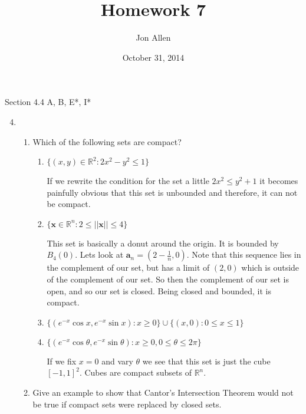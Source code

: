 \documentclass[letterpaper]{article}
\begin{document}
\title{Homework 7}
\date{October 31, 2014}
\author{Jon Allen}
\maketitle
Section 4.4  A, B, E*, I*
\renewcommand{\labelenumi}{4.\arabic{enumi}}
\renewcommand{\labelenumii}{\Alph{enumii}.}
\renewcommand{\labelenumiii}{(\alph{enumiii})}
\begin{enumerate}
\setcounter{enumi}{3}
\item
  \begin{enumerate}
  \item
    Which of the following sets are compact?
    \begin{enumerate}
    \item
      $\{(x,y)\in\mathbb{R}^2:2x^{2}-y^{2}\le 1\}$

      If we rewrite the condition for the set a little $2x^2\le y^2+1$ it becomes painfully obvious that this set is unbounded and therefore, it can not be compact.
    \item
      $\{\boldsymbol{x}\in\mathbb{R}^n:2\le||\boldsymbol{x}||\le4\}$

      This set is basically  a donut around the origin. It is bounded by $B_4(0)$. Lets look at $\boldsymbol{a}_n=(2-\frac{1}{n},0)$. Note that this sequence lies in the complement of our set, but has a limit of $(2,0)$ which is outside of the complement of our set. So  then the complement of our set is open, and so our set is closed. Being closed and bounded, it is compact.
    \item
      $\{(e^{-x}\cos x,e^{-x}\sin x):x\ge 0\}\cup\{(x,0):0\le x\le 1\}$
    \item
      $\{(e^{-x}\cos \theta,e^{-x}\sin \theta):x\ge0,0\le\theta\le2\pi\}$

      If we fix $x=0$ and vary $\theta$ we see that this set is just the cube $[-1,1]^2$. Cubes are compact subsets of $\mathbb{R}^n$.
    \end{enumerate}
  \item
    Give an example to show that Cantor's Intersection Theorem would not be true if compact sets were replaced by closed sets.


\end{enumerate}
\end{enumerate}
\end{document}
